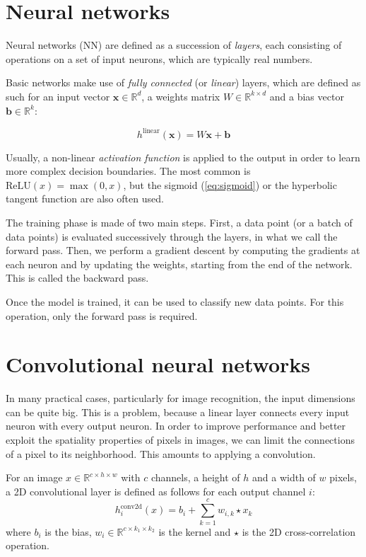 \documentclass[a4paper,11pt,oneside]{report}
\begin{document}
\section{Neural networks}

Neural networks (NN) are defined as a succession of \emph{layers}, each consisting of operations on a set of input neurons, which are typically real numbers.

Basic networks make use of \emph{fully connected} (or \emph{linear}) layers, which are defined as such for an input vector $\mathbf{x} \in \mathbb{R}^d$, a weights matrix $W \in \mathbb{R}^{k \times d}$ and a bias vector $\mathbf{b} \in \mathbb{R}^k$:

\begin{equation}\label{eq:linear_layer}
    h^{\mathrm{linear}}(\mathbf{x}) = W \mathbf{x} + \mathbf{b}
\end{equation}

Usually, a non-linear \emph{activation function} is applied to the output in order to learn more complex decision boundaries. 
The most common is $\mathrm{ReLU}(x) = \max(0, x)$, but the sigmoid (\autoref{eq:sigmoid}) or the hyperbolic tangent function are also often used.

The training phase is made of two main steps. 
First, a data point (or a batch of data points) is evaluated successively through the layers, in what we call the forward pass. 
Then, we perform a gradient descent by computing the gradients at each neuron and by updating the weights, starting from the end of the network. 
This is called the backward pass.

Once the model is trained, it can be used to classify new data points. 
For this operation, only the forward pass is required.

\section{Convolutional neural networks}

In many practical cases, particularly for image recognition, the input dimensions can be quite big. 
This is a problem, because a linear layer connects every input neuron with every output neuron. 
In order to improve performance and better exploit the spatiality properties of pixels in images, we can limit the connections of a pixel to its neighborhood. 
This amounts to applying a convolution.

For an image $x \in \mathbb{R}^{c \times h \times w}$ with $c$ channels, a height of $h$ and a width of $w$ pixels, a 2D convolutional layer is defined as follows for each output channel $i$:
\begin{equation}\label{eq:conv2d_layer}
    h_i^{\mathrm{conv2d}}(x) = b_i + \sum_{k=1}^{c} w_{i, k} \star x_{k}
\end{equation}
where $b_i$ is the bias, $w_i \in \mathbb{R}^{c \times k_1 \times k_2}$ is the kernel and $\star$ is the 2D cross-correlation operation.
\end{document}
